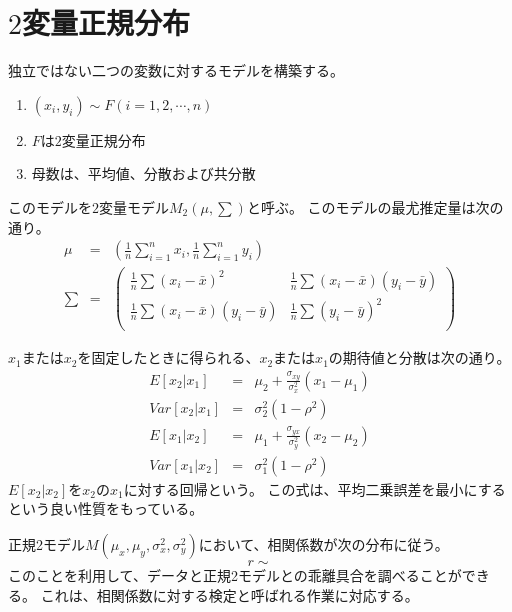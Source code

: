 \section{$2$変量正規分布}
独立ではない二つの変数に対するモデルを構築する。
\begin{enumerate}
 \item $(x_i,y_i)\sim F (i=1,2,\cdots,n)$
 \item $F$は$2$変量正規分布
 \item 母数は、平均値、分散および共分散
\end{enumerate}
このモデルを$2$変量モデル$M_{2}(\mu,\sum)$と呼ぶ。
このモデルの最尤推定量は次の通り。
\begin{eqnarray*}
 \mu &=& \left(\frac{1}{n}\sum_{i=1}^n x_i,\frac{1}{n}\sum_{i=1}^n y_i \right) \\
 \sum &=& \begin{pmatrix}
\frac{1}{n}\sum (x_i-\bar{x})^2 &  \frac{1}{n}\sum (x_i-\bar{x})(y_i-\bar{y})\\
\frac{1}{n}\sum (x_i-\bar{x})(y_i-\bar{y}) & \frac{1}{n}\sum (y_i-\bar{y})^2 \\
\end{pmatrix}
\end{eqnarray*}

$x_1$または$x_2$を固定したときに得られる、$x_2$または$x_1$の期待値と分散は次の通り。
\begin{eqnarray*}
 E[x_2|x_1] &=& \mu_2+\frac{\sigma_{xy}}{\sigma_x^2}(x_1-\mu_1)\\
 Var[x_2|x_1]  &=& \sigma_2^2(1-\rho^2) \\
 E[x_1|x_2] &=& \mu_1+\frac{\sigma_{yx}}{\sigma_y^2}(x_2-\mu_2)\\
 Var[x_1|x_2]  &=& \sigma_1^2(1-\rho^2)
\end{eqnarray*}
$E[x_2|x_2]$を$x_2$の$x_1$に対する回帰という。
この式は、平均二乗誤差を最小にするという良い性質をもっている。



正規2モデル$M(\mu_x,\mu_y,\sigma_x^2,\sigma_y^2)$において、相関係数が次の分布に従う。
\begin{equation*}
 r \sim 
\end{equation*}
このことを利用して、データと正規2モデルとの乖離具合を調べることができる。
これは、相関係数に対する検定と呼ばれる作業に対応する。


